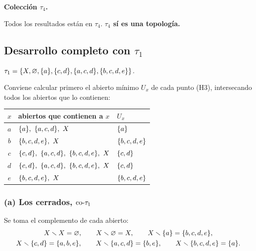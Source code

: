 \textbf{Colección $\tau_4$.}
\begin{center}\end{center}
Todos los resultados están en $\tau_4$. \textbf{$\tau_4$ sí es una topología.}


\subsection{Desarrollo completo con \texorpdfstring{$\tau_1$}{tau1}}
$\tau_1=\{X,\varnothing,\{a\},\{c,d\},\{a,c,d\},\{b,c,d,e\}\}$.

Conviene calcular primero el abierto mínimo $U_x$ de cada punto (H3), intersecando todos los abiertos que lo
contienen:
\begin{center}\small\renewcommand{\arraystretch}{1.2}
\begin{tabular}{@{}cll@{}}\toprule
$x$ & abiertos que contienen a $x$ & $U_x$\\ \midrule
$a$ & $\s{a},\ \s{a,c,d},\ X$ & $\{a\}$\\
$b$ & $\s{b,c,d,e},\ X$ & $\{b,c,d,e\}$\\
$c$ & $\s{c,d},\ \s{a,c,d},\ \s{b,c,d,e},\ X$ & $\{c,d\}$\\
$d$ & $\s{c,d},\ \s{a,c,d},\ \s{b,c,d,e},\ X$ & $\{c,d\}$\\
$e$ & $\s{b,c,d,e},\ X$ & $\{b,c,d,e\}$\\ \bottomrule
\end{tabular}\end{center}

\subsubsection*{(a) Los cerrados, $\mathrm{co}\text{-}\tau_1$}
Se toma el complemento de cada abierto:
\begin{gather*}
X\smallsetminus X=\varnothing,\qquad X\smallsetminus\varnothing=X,\qquad X\smallsetminus\{a\}=\{b,c,d,e\},\\
X\smallsetminus\{c,d\}=\{a,b,e\},\qquad X\smallsetminus\{a,c,d\}=\{b,e\},\qquad X\smallsetminus\{b,c,d,e\}=\{a\}.
\end{gather*}

